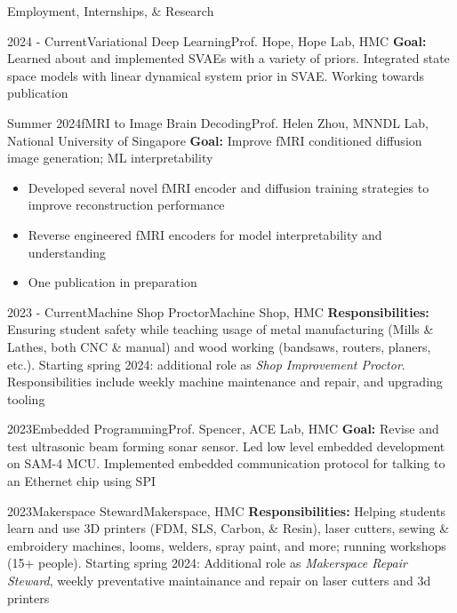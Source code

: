 \documentclass[]{mcdowellcv}
\begin{document}
\begin{cvsection}{Employment, Internships, \& Research}
	\begin{cvsubsection}{2024 - Current}{Variational Deep Learning}{Prof. Hope, Hope Lab, HMC}
		\textbf{Goal:} Learned about and implemented SVAEs with a variety of priors. Integrated state space models with linear dynamical system prior in SVAE. Working towards publication
	\end{cvsubsection}

	\begin{cvsubsection}{Summer 2024}{fMRI to Image Brain Decoding}{Prof. Helen Zhou, MNNDL Lab, National University of Singapore}
		\vspace{-0.2em}
		\textbf{Goal:} Improve fMRI conditioned diffusion image generation; ML interpretability
		\begin{itemize}
			\item Developed several novel fMRI encoder and diffusion training strategies to improve reconstruction performance
			\item Reverse engineered fMRI encoders for model interpretability and understanding
			\item One publication in preparation
		\end{itemize}
	\end{cvsubsection}

	\begin{cvsubsection}{2023 - Current}{Machine Shop Proctor}{Machine Shop, HMC}
		\vspace{0.2em}
		\textbf{Responsibilities:} Ensuring student safety while teaching usage of metal manufacturing (Mills \& Lathes, both CNC \& manual) and wood working (bandsaws, routers, planers, etc.). Starting spring 2024: additional role as \textit{Shop Improvement Proctor}. Responsibilities include weekly machine maintenance and repair, and upgrading tooling
	\end{cvsubsection}

	\begin{cvsubsection}{2023}{Embedded Programming}{Prof. Spencer, ACE Lab, HMC}
		\textbf{Goal:}  Revise and test ultrasonic beam forming sonar sensor. Led low level embedded development on SAM-4 MCU. Implemented embedded
		communication protocol for talking to an Ethernet chip using SPI
	\end{cvsubsection}

	\begin{cvsubsection}{2023}{Makerspace Steward}{Makerspace, HMC}
		\vspace{0.2em}
		\textbf{Responsibilities:} Helping students learn and use 3D printers (FDM, SLS, Carbon, \& Resin), laser cutters, sewing \& embroidery machines, looms, welders, spray paint, and more; running workshops (15+ people). Starting spring 2024: Additional role as \textit{Makerspace Repair Steward}, weekly preventative maintainance and repair on laser cutters and 3d printers
	\end{cvsubsection}


\end{cvsection}
\end{document}
